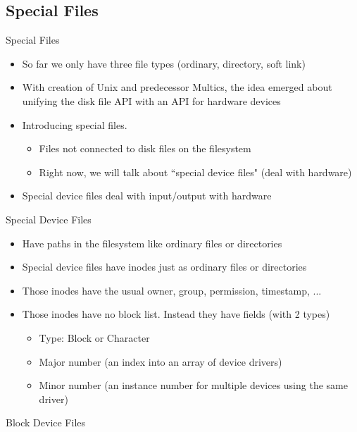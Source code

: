 \subsection{Special Files}
Special Files
\begin{itemize}
    \item So far we only have three file types (ordinary, directory, soft link)
    \item With creation of Unix and predecessor Multics, the idea emerged about unifying the disk file API with an API for hardware devices
    \item Introducing special files.
    \begin{itemize}
        \item Files not connected to disk files on the filesystem
        \item Right now, we will talk about ``special device files" (deal with hardware)
    \end{itemize}
    \item Special device files deal with input/output with hardware
\end{itemize}
Special Device Files
\begin{itemize}
    \item Have paths in the filesystem like ordinary files or directories
    \item Special device files have inodes just as ordinary files or directories
    \item Those inodes have the usual owner, group, permission, timestamp, ...
    \item Those inodes have no block list. Instead they have fields (with 2 types)
    \begin{itemize}
        \item Type: Block or Character
        \item Major number (an index into an array of device drivers)
        \item Minor number (an instance number for multiple devices using the same driver)
    \end{itemize}
\end{itemize}
Block Device Files
